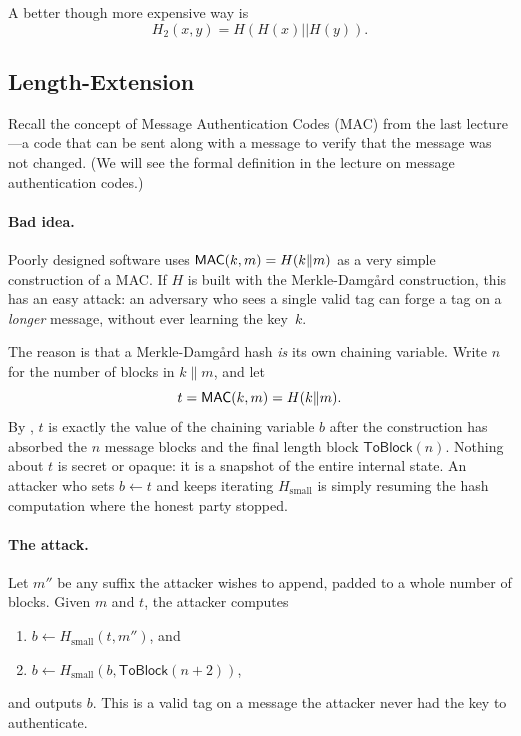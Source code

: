 A better though more expensive way is
\[ H_2(x, y) = H(H(x) || H(y)). \]


\subsection{Length-Extension}
Recall the concept of Message Authentication Codes
(MAC) from the last lecture---a code that can be
sent along with a message to verify that the message was not changed.
(We will see the formal definition in the lecture on message authentication codes.)

\paragraph{Bad idea.}
Poorly designed software uses $\mathsf{MAC}(k, m) = H(k \| m)$ as a very simple
construction of a MAC.
If $H$ is built with the Merkle-Damg\aa{}rd construction, this has an easy
attack: an adversary who sees a single valid tag can forge a tag on a
\emph{longer} message, without ever learning the key~$k$.

The reason is that a Merkle-Damg\aa{}rd hash \emph{is} its own chaining
variable. Write $n$ for the number of blocks in $k \| m$, and let
\[
  t = \mathsf{MAC}(k, m) = H(k \| m).
\]
By , $t$ is exactly the value of the chaining variable $b$ after
the construction has absorbed the $n$ message blocks and the final length
block $\mathsf{ToBlock}(n)$. Nothing about $t$ is secret or opaque: it is a
snapshot of the entire internal state. An attacker who sets $b \gets t$ and
keeps iterating $H_\text{small}$ is simply resuming the hash computation where
the honest party stopped.

\paragraph{The attack.}
Let $m''$ be any suffix the attacker wishes to append,
padded to a whole number of blocks. Given $m$ and $t$, the attacker
computes
\begin{enumerate}
  \item $b \gets H_\text{small}(t, m'')$, and
  \item $b \gets H_\text{small}(b, \mathsf{ToBlock}(n+2))$,
\end{enumerate}
and outputs $b$. This is a valid tag on a message the attacker never had the
key to authenticate.

